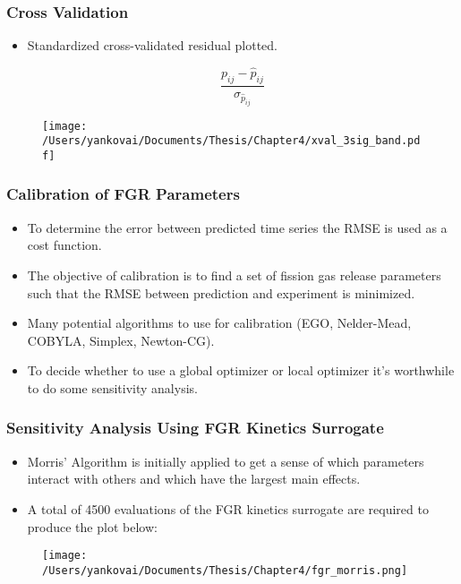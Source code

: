 \begin{frame}
\frametitle{Cross Validation}

\begin{itemize}
  \item Standardized cross-validated residual plotted.

\begin{equation}
 \frac{ p_{ij} - \hat{p}_{ij} }{ \sigma_{\hat{p}_{ij}} } \nonumber
\end{equation}  

\end{itemize}

\begin{figure}
  \texttt{[image: /Users/yankovai/Documents/Thesis/Chapter4/xval\_3sig\_band.pdf]}
\end{figure}

\end{frame}
\begin{frame}
\frametitle{Calibration of FGR Parameters}

\begin{itemize}
  \item To determine the error between predicted time series the RMSE is used as a cost function. 
  \item The objective of calibration is to find a set of fission gas release parameters such that the RMSE between prediction and experiment is minimized.
  \item Many potential algorithms to use for calibration (EGO, Nelder-Mead, COBYLA, Simplex, Newton-CG).
  \item To decide whether to use a global optimizer or local optimizer it's worthwhile to do some sensitivity analysis.  
\end{itemize}

\end{frame}
\begin{frame}
\frametitle{Sensitivity Analysis Using FGR Kinetics Surrogate}

\begin{itemize}
  \item Morris' Algorithm is initially applied to get a sense of which parameters interact with others and which have the largest main effects.
  \item A total of 4500 evaluations of the FGR kinetics surrogate are required to produce the plot below:
\end{itemize}

\begin{figure}
  \texttt{[image: /Users/yankovai/Documents/Thesis/Chapter4/fgr\_morris.png]}
\end{figure}

\end{frame}
